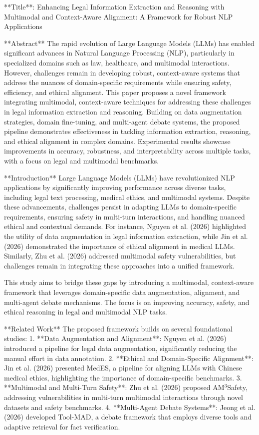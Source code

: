 **Title**: Enhancing Legal Information Extraction and Reasoning with Multimodal and Context-Aware Alignment: A Framework for Robust NLP Applications  

**Abstract**  
The rapid evolution of Large Language Models (LLMs) has enabled significant advances in Natural Language Processing (NLP), particularly in specialized domains such as law, healthcare, and multimodal interactions. However, challenges remain in developing robust, context-aware systems that address the nuances of domain-specific requirements while ensuring safety, efficiency, and ethical alignment. This paper proposes a novel framework integrating multimodal, context-aware techniques for addressing these challenges in legal information extraction and reasoning. Building on data augmentation strategies, domain fine-tuning, and multi-agent debate systems, the proposed pipeline demonstrates effectiveness in tackling information extraction, reasoning, and ethical alignment in complex domains. Experimental results showcase improvements in accuracy, robustness, and interpretability across multiple tasks, with a focus on legal and multimodal benchmarks.  

**Introduction**  
Large Language Models (LLMs) have revolutionized NLP applications by significantly improving performance across diverse tasks, including legal text processing, medical ethics, and multimodal systems. Despite these advancements, challenges persist in adapting LLMs to domain-specific requirements, ensuring safety in multi-turn interactions, and handling nuanced ethical and contextual demands. For instance, Nguyen et al. (2026) highlighted the utility of data augmentation in legal information extraction, while Jin et al. (2026) demonstrated the importance of ethical alignment in medical LLMs. Similarly, Zhu et al. (2026) addressed multimodal safety vulnerabilities, but challenges remain in integrating these approaches into a unified framework.  

This study aims to bridge these gaps by introducing a multimodal, context-aware framework that leverages domain-specific data augmentation, alignment, and multi-agent debate mechanisms. The focus is on improving accuracy, safety, and ethical reasoning in legal and multimodal NLP tasks.  

**Related Work**  
The proposed framework builds on several foundational studies:  
1. **Data Augmentation and Alignment**: Nguyen et al. (2026) introduced a pipeline for legal data augmentation, significantly reducing the manual effort in data annotation.  
2. **Ethical and Domain-Specific Alignment**: Jin et al. (2026) presented MedES, a pipeline for aligning LLMs with Chinese medical ethics, highlighting the importance of domain-specific benchmarks.  
3. **Multimodal and Multi-Turn Safety**: Zhu et al. (2026) proposed AM$^3$Safety, addressing vulnerabilities in multi-turn multimodal interactions through novel datasets and safety benchmarks.  
4. **Multi-Agent Debate Systems**: Jeong et al. (2026) developed Tool-MAD, a debate framework that employs diverse tools and adaptive retrieval for fact verification.  

